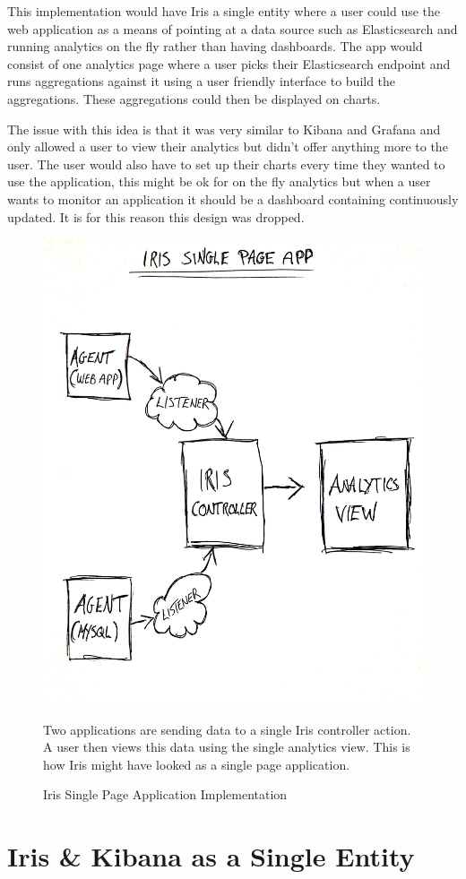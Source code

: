 \documentclass[12pt,a4paper,titlepage]{report}
\begin{document}
\begin{appendices}
This implementation would have Iris a single entity where a user could use the web application as a means of pointing at a data source such as Elasticsearch and running analytics on the fly rather than having dashboards. The app would consist of one analytics page where a user picks their Elasticsearch endpoint and runs aggregations against it using a user friendly interface to build the aggregations. These aggregations could then be displayed on charts.

The issue with this idea is that it was very similar to Kibana and Grafana and only allowed a user to view their analytics but didn’t offer anything more to the user. The user would also have to set up their charts every time they wanted to use the application, this might be ok for on the fly analytics but when a user wants to monitor an application it should be a dashboard containing continuously updated. It is for this reason this design was dropped. 

\begin{figure}[H]
\begin{tcolorbox}
\centerline{\includegraphics[width=.55\textwidth]{iris_single_page_app}}

Two applications are sending data to a single Iris controller action. A user then views this data using the single analytics view. This is how Iris might have looked as a single page application.
\end{tcolorbox}
\caption{Iris Single Page Application Implementation}
\end{figure}

\section{Iris \& Kibana as a Single Entity}


\end{appendices}
\end{document}
